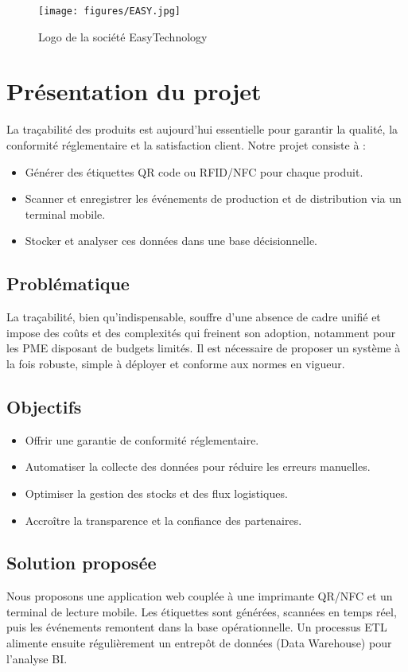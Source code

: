 \documentclass[12pt,a4paper]{report}
\begin{document}
\begin{figure}[H]
  \centering
  \texttt{[image: figures/EASY.jpg]}
  \caption{Logo de la société EasyTechnology}
  \label{fig:logo_easy}
\end{figure}

\section{Présentation du projet}
La traçabilité des produits est aujourd’hui essentielle pour garantir la qualité, la conformité réglementaire et la satisfaction client. Notre projet consiste à :
\begin{itemize}
  \item Générer des étiquettes QR code ou RFID/NFC pour chaque produit.
  \item Scanner et enregistrer les événements de production et de distribution via un terminal mobile.
  \item Stocker et analyser ces données dans une base décisionnelle.
\end{itemize}

\subsection{Problématique}
La traçabilité, bien qu’indispensable, souffre d’une absence de cadre unifié et impose des coûts et des complexités qui freinent son adoption, notamment pour les PME disposant de budgets limités. Il est nécessaire de proposer un système à la fois robuste, simple à déployer et conforme aux normes en vigueur.

\subsection{Objectifs}
\begin{itemize}
  \item Offrir une garantie de conformité réglementaire.
  \item Automatiser la collecte des données pour réduire les erreurs manuelles.
  \item Optimiser la gestion des stocks et des flux logistiques.
  \item Accroître la transparence et la confiance des partenaires.
\end{itemize}

\subsection{Solution proposée}
Nous proposons une application web couplée à une imprimante QR/NFC et un terminal de lecture mobile. Les étiquettes sont générées, scannées en temps réel, puis les événements remontent dans la base opérationnelle. Un processus ETL alimente ensuite régulièrement un entrepôt de données (Data Warehouse) pour l’analyse BI.
\end{document}
